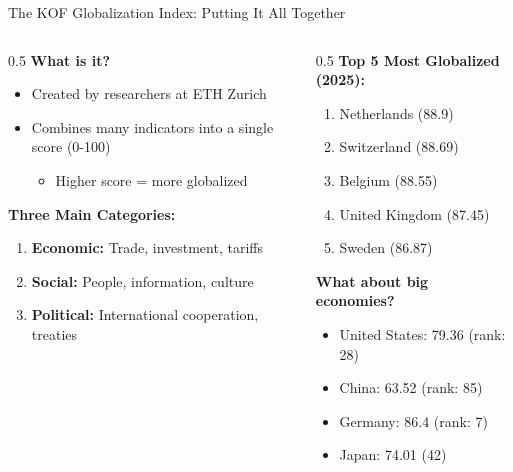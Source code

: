 \documentclass{beamer}
\begin{document}
\begin{frame}{The KOF Globalization Index: Putting It All Together}
\small
\begin{columns}
\begin{column}{0.5\textwidth}
    \textbf{What is it?}
    \begin{itemize} \footnotesize
        \item Created by researchers at ETH Zurich
        \item Combines many indicators into a single score (0-100)
        \begin{itemize}
            \item Higher score = more globalized 
        \end{itemize}
    \end{itemize}
    \textbf{Three Main Categories:}
    \begin{enumerate} \footnotesize
        \item \textbf{Economic:} Trade, investment, tariffs
        \item \textbf{Social:} People, information, culture
        \item \textbf{Political:} International cooperation, treaties
    \end{enumerate}
\end{column}
\begin{column}{0.5\textwidth}
    \textbf{Top 5 Most Globalized (2025):}
    \begin{enumerate} \footnotesize
        \item Netherlands (88.9)
        \item Switzerland (88.69)
        \item Belgium (88.55)
        \item United Kingdom (87.45)
        \item Sweden (86.87)
    \end{enumerate}
    \textbf{What about big economies?}
    \begin{itemize} \footnotesize
        \item United States: 79.36 (rank: 28)
        \item China: 63.52 (rank: 85)
        \item Germany: 86.4 (rank: 7)
        \item Japan: 74.01 (42)
    \end{itemize}
\end{column}
\end{columns}
\end{frame}
\end{document}
